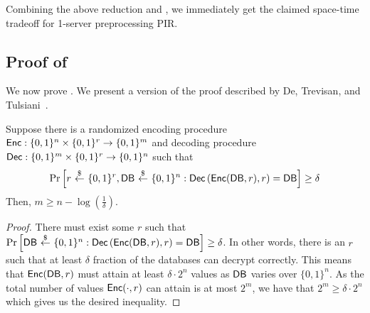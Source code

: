 Combining the above reduction and 
, we immediately get the claimed space-time
tradeoff for 1-server preprocessing PIR. 






\subsection{Proof of } 
\label{sec:prob-yao}
We now prove . 
We present a version of the proof described by De, Trevisan, 
and Tulsiani~\cite{DTT10}. 


\begin{fact}
Suppose there is a randomized encoding procedure
${\sf Enc}: \{0, 1\}^n \times \{0, 1\}^r \rightarrow \{0, 1\}^m$
and decoding procedure 
${\sf Dec}: \{0, 1\}^m \times \{0, 1\}^r \rightarrow \{0, 1\}^n$
such that 
\[
\Pr\left[
r~{\overset{\$}{\leftarrow}}~\{0, 1\}^r, {\sf DB} ~{\overset{\$}{\leftarrow}}~ \{0, 1\}^n:
{\sf Dec}\left({\sf Enc}({\sf DB}, r), r\right)
= {\sf DB}
\right]
\geq \delta
\]
Then, $m \geq n - \log(\frac{1}{\delta})$.
\end{fact}
\begin{proof}
There must exist some $r$ such that 
$\Pr\left[{\sf DB} ~{\overset{\$}{\leftarrow}}~ \{0, 1\}^n:
{\sf Dec}\left({\sf Enc}({\sf DB}, r), r\right)
= {\sf DB}
\right]\geq \delta$.
In other words, there is an $r$ such that at least $\delta$ 
fraction of the databases can decrypt correctly.
This means that ${\sf Enc}({\sf DB}, r)$
must attain at least 
$\delta \cdot 2^n$ values 
as ${\sf DB}$ varies over $\{0, 1\}^n$.
As the total number of values ${\sf Enc}(\cdot, r)$ can attain
is at most $2^m$, we have that 
$2^m \geq \delta \cdot 2^n$ which gives us the desired
inequality.
\end{proof}


